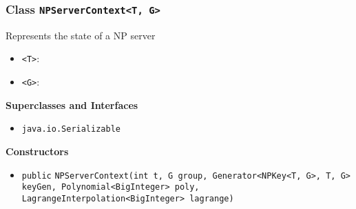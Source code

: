\subsubsection{Class \lstinline|NPServerContext<T, G>|}
Represents the state of a NP server \\
\noindent\begin{minipage}[t]{5cm}
\vspace{0.3em}
\hspace*{2em}
\vspace{0.3em}
\end{minipage}

\begin{itemize}
\item \lstinline|<T>|: 
\item \lstinline|<G>|: 
\end{itemize}


\textbf{\sffamily Superclasses and Interfaces}
\begin{itemize}
\item \lstinline|java.io.Serializable|
\end{itemize}


\textbf{\sffamily Constructors}
\begin{itemize}
\item \lstinline|public| \lstinline|NPServerContext|\lstinline|(int t, G group, Generator<NPKey<T, G>, T, G> keyGen, Polynomial<BigInteger> poly, LagrangeInterpolation<BigInteger> lagrange)| \\[-0.6em]




\end{itemize}


